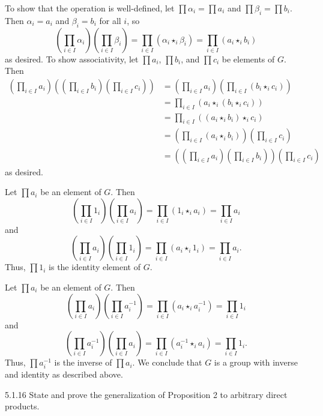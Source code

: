 \begin{solenum}
    \item To show that the operation is well-defined, let $\prod \alpha_i = \prod a_i$ and $\prod \beta_i = \prod b_i$.
	Then $\alpha_i = a_i$ and $\beta_i = b_i$ for all $i$, so
    \[
    	\left(\prod_{i \in I} \alpha_i\right)\left(\prod_{i \in I} \beta_i\right) = \prod_{i \in I} (\alpha_i \star_i \beta_i) = \prod_{i \in I} (a_i \star_i b_i)
    \]
    as desired.
	To show associativity, let $\prod a_i$, $\prod b_i$, and $\prod c_i$ be elements of $G$.
	Then
    \begin{align*}
        \left(\prod_{i \in I} a_i\right)\left(\left(\prod_{i \in I} b_i\right)\left(\prod_{i \in I} c_i\right)\right) & = \left(\prod_{i \in I} a_i\right)\left(\prod_{i \in I} (b_i \star_i c_i)\right) \\
        & = \prod_{i \in I} (a_i \star_i (b_i \star_i c_i)) \\
        & = \prod_{i \in I} ((a_i \star_i b_i) \star_i c_i) \\
        & = \left(\prod_{i \in I} (a_i \star_i b_i)\right)\left(\prod_{i \in I} c_i\right) \\
        & = \left(\left(\prod_{i \in I} a_i\right)\left(\prod_{i \in I} b_i\right)\right)\left(\prod_{i \in I} c_i\right)
    \end{align*}
    as desired.
    \item Let $\prod a_i$ be an element of $G$.
	Then
    \[
    	\left(\prod_{i \in I} 1_i\right)\left(\prod_{i \in I} a_i\right) = \prod_{i \in I} (1_i \star_i a_i) = \prod_{i \in I} a_i
    \]
    and
    \[
    	\left(\prod_{i \in I} a_i\right)\left(\prod_{i \in I} 1_i\right) = \prod_{i \in I} (a_i \star_i 1_i) = \prod_{i \in I} a_i.
    \]
    Thus, $\prod 1_i$ is the identity element of $G$.
    \item Let $\prod a_i$ be an element of $G$.
	Then
    \[
    	\left(\prod_{i \in I} a_i\right)\left(\prod_{i \in I} a_i^{-1}\right) = \prod_{i \in I} (a_i \star_i a_i^{-1}) = \prod_{i \in I} 1_i
    \]
    and
    \[
    	\left(\prod_{i \in I} a_i^{-1}\right)\left(\prod_{i \in I} a_i\right) = \prod_{i \in I} (a_i^{-1} \star_i a_i) = \prod_{i \in I} 1_i.
    \]
    Thus, $\prod a_i^{-1}$ is the inverse of $\prod a_i$.
	We conclude that $G$ is a group with inverse and identity as described above.
\end{solenum}

\begin{exercise}{5.1.16}
    State and prove the generalization of Proposition 2 to arbitrary direct products.
\end{exercise}

